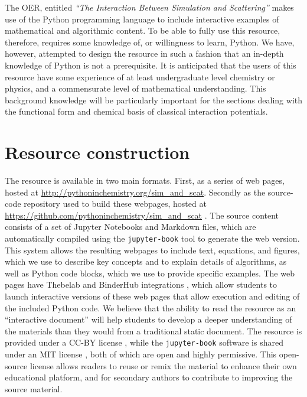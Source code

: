 \documentclass[amsmath,amssymb,twocolumn,superscriptaddress]{revtex4-1}
\begin{document}
The OER, entitled \emph{``The Interaction Between Simulation and Scattering''} makes use of the Python programming language to include interactive examples of mathematical and algorithmic content.
To be able to fully use this resource, therefore, requires some knowledge of, or willingness to learn, Python.
We have, however, attempted to design the resource in such a fashion that an in-depth knowledge of Python is not a prerequisite.
It is anticipated that the users of this resource have some experience of at least undergraduate level chemistry or physics, and a commensurate level of mathematical understanding.
This background knowledge will be particularly important for the sections dealing with the functional form and chemical basis of classical interaction potentials.

\section{Resource construction}

The resource is available in two main formats. First, as a series of web pages, hosted at \url{http://pythoninchemistry.org/sim_and_scat}.
Secondly as the source-code repository used to build these webpages, hosted at \url{https://github.com/pythoninchemistry/sim_and_scat} \cite{mccluskey_pythoninchemistry/sim_and_scat_2019}.
The source content consists of a set of Jupyter Notebooks and Markdown files, which are automatically compiled using the \texttt{jupyter-book} tool \cite{lau_jupyter/jupyter-book_2019} to generate the web version.
This system allows the resulting webpages to include text, equations, and figures, which we use to describe key concepts and to explain details of algorithms, as well as Python code blocks, which we use to provide specific examples. The web pages have Thebelab and BinderHub integrations \cite{ragan-kelley_minrk/thebelab_2019, ragan-kelley_jupyterhub/binderhub_2019, jupyter_binder_2018}, which allow students to launch interactive versions of these web pages that allow execution and editing of the included Python code.
We believe that the ability to read the resource as an ``interactive document'' will help students to develop a deeper understanding of the materials than they would from a traditional static document.
The resource is provided under a CC-BY license \cite{noauthor_creative_2019}, while the \texttt{jupyter-book} software is shared under an MIT license \cite{noauthor_mit_2019}, both of which are open and highly permissive.
This open-source license allows readers to reuse or remix the material to enhance their own educational platform, and for secondary authors to contribute to improving the source material.
\end{document}
